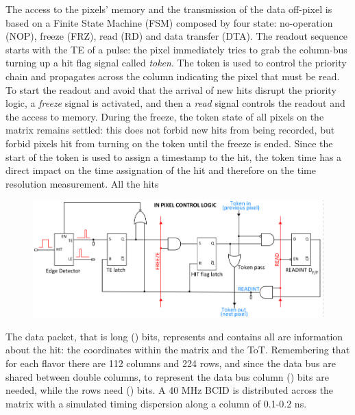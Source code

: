     The access to the pixels' memory and the transmission of the data off-pixel is based on a Finite State Machine (FSM) composed by four state: no-operation (NOP), freeze (FRZ), read (RD) and data transfer (DTA). The readout sequence starts with the TE of a pulse: the pixel immediately tries to grab the column-bus turning up a hit flag signal called \textit{token}.   
    The token is used to control the priority chain and propagates across the column indicating the pixel that must be read. To start the readout and avoid that the arrival of new hits disrupt the priority logic, a \textit{freeze} signal is activated, and then a \textit{read} signal controls the readout and the access to memory.
    During the freeze, the token state of all pixels on the matrix remains settled: this does not forbid new hits from being recorded, but forbid pixels hit from turning on the token until the freeze is ended. 
    Since the start of the token is used to assign a timestamp to the hit, the token time has a direct impact on the time assignation of the hit and therefore on the time resolution measurement. All the hits     
    
    \begin{figure}[h!]
        \centering
        \includegraphics[width=.7\linewidth]{figures/Monopix1/Monopix1_readout_schematics.png}
        \caption{}
        \label{fig:Monopix1_readout_schematics}
    \end{figure}
    The data packet, that is long () bits, represents and contains all are information about the hit: the coordinates within the matrix and the ToT. Remembering that for each flavor there are 112 columns and 224 rows, and since the data bus are shared between double columns, to represent the data bus column () bits are needed, while the rows need () bits. 
    A 40 MHz BCID is distributed across the matrix with a simulated timing dispersion along a column of 0.1-0.2 ns. 


